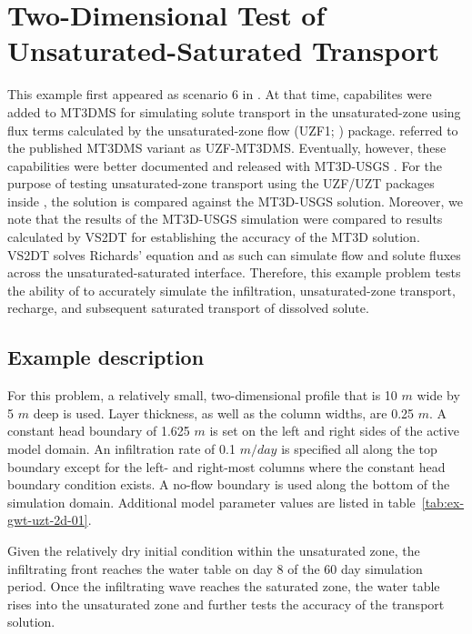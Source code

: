 \section{Two-Dimensional Test of Unsaturated-Saturated Transport}

This example first appeared as scenario 6 in \cite{morway2013}.  At that time, capabilites were added to MT3DMS \citep{zheng1999mt3dms} for simulating solute transport in the unsaturated-zone using flux terms calculated by the unsaturated-zone flow (UZF1; \cite{UZF}) package. \cite{morway2013} referred to the published MT3DMS variant as UZF-MT3DMS. Eventually, however, these capabilities were better documented and released with MT3D-USGS \citep{mt3dusgs}. For the purpose of testing unsaturated-zone transport using the UZF/UZT packages inside \mf, the \mf solution is compared against the MT3D-USGS solution. Moreover, we note that the results of the  MT3D-USGS simulation were compared to results calculated by VS2DT \citep{lappalaetal1987VS2D} for establishing the accuracy of the MT3D solution.  VS2DT solves Richards' equation and as such can simulate flow and solute fluxes across the unsaturated-saturated interface.  Therefore, this example problem tests the ability of \mf to accurately simulate the infiltration, unsaturated-zone transport, recharge, and subsequent saturated transport of dissolved solute.

\subsection{Example description}

For this problem, a relatively small, two-dimensional profile that is 10 $m$ wide by 5 $m$ deep is used.  Layer thickness, as well as the column widths, are 0.25 $m$. A constant head boundary of 1.625 $m$ is set on the left and right sides of the active model domain.  An infiltration rate of 0.1 $m/day$ is specified all along the top boundary except for the left- and right-most columns where the constant head boundary condition exists.  A no-flow boundary is used along the bottom of the simulation domain.   Additional model parameter values are listed in table~\ref{tab:ex-gwt-uzt-2d-01}.  



Given the relatively dry initial condition within the unsaturated zone, the infiltrating front reaches the water table on day 8 of the 60 day simulation period. Once the infiltrating wave reaches the saturated zone, the water table rises into the unsaturated zone and further tests the accuracy of the transport solution.

